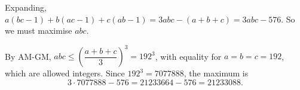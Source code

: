 Expanding, $a(bc-1)+b(ac-1)+c(ab-1)=3abc-(a+b+c)=3abc-576$. So we must maximise $abc$.

By AM-GM, $abc\le\left(\dfrac{a+b+c}{3}\right)^3=192^3$, with equality for $a=b=c=192$, which are allowed integers. Since $192^3=7077888$, the maximum is
\[
3\cdot7077888-576=21233664-576=\boxed{21233088}.
\]
